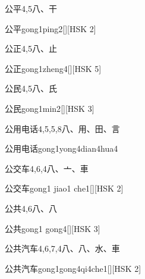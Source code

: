 \begin{entry}{公平}{4,5}{⼋、⼲}
  \begin{phonetics}{公平}{gong1ping2}[][HSK 2]
  \end{phonetics}
\end{entry}

\begin{entry}{公正}{4,5}{⼋、⽌}
  \begin{phonetics}{公正}{gong1zheng4}[][HSK 5]
  \end{phonetics}
\end{entry}

\begin{entry}{公民}{4,5}{⼋、⽒}
  \begin{phonetics}{公民}{gong1min2}[][HSK 3]
  \end{phonetics}
\end{entry}

\begin{entry}{公用电话}{4,5,5,8}{⼋、⽤、⽥、⾔}
  \begin{phonetics}{公用电话}{gong1yong4dian4hua4}
  \end{phonetics}
\end{entry}

\begin{entry}{公交车}{4,6,4}{⼋、⼇、⾞}
  \begin{phonetics}{公交车}{gong1 jiao1 che1}[][HSK 2]
  \end{phonetics}
\end{entry}

\begin{entry}{公共}{4,6}{⼋、⼋}
  \begin{phonetics}{公共}{gong1 gong4}[][HSK 3]
  \end{phonetics}
\end{entry}

\begin{entry}{公共汽车}{4,6,7,4}{⼋、⼋、⽔、⾞}
  \begin{phonetics}{公共汽车}{gong1gong4qi4che1}[][HSK 2]
  \end{phonetics}
\end{entry}

